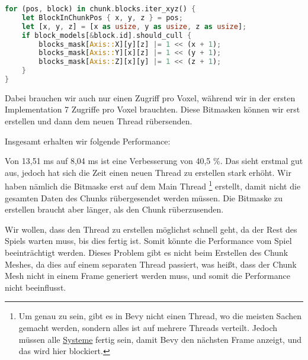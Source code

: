 \begin{lstlisting}[language=Rust]
for (pos, block) in chunk.blocks.iter_xyz() {
	let BlockInChunkPos { x, y, z } = pos;
	let [x, y, z] = [x as usize, y as usize, z as usize];
	if block_models[&block.id].should_cull {
		blocks_mask[Axis::X][y][z] |= 1 << (x + 1);
		blocks_mask[Axis::Y][x][z] |= 1 << (y + 1);
		blocks_mask[Axis::Z][x][y] |= 1 << (z + 1);
	}
}
\end{lstlisting}

Dabei brauchen wir auch nur einen Zugriff pro Voxel,
während wir in der ersten Implementation 7 Zugriffe
pro Voxel brauchten.
Diese Bitmasken können wir erst erstellen und
dann dem neuen Thread rübersenden.


Insgesamt erhalten wir folgende Performance:

\vspace{0.3cm}


\vspace{0.3cm}

Von 13,51 ms auf 8,04 ms ist eine Verbesserung
von 40,5 \%. Das sieht erstmal gut aus,
jedoch hat sich die Zeit einen neuen Thread zu
erstellen stark erhöht. Wir haben nämlich die Bitmaske
erst auf dem Main Thread
\footnote{Um genau zu sein, gibt es in Bevy
nicht einen  Thread, wo die meisten Sachen
gemacht werden, sondern alles ist auf mehrere Threads
verteilt. Jedoch müssen alle
\href{https://bevy-cheatbook.github.io/programming/systems.html}{Systeme}
fertig sein, damit Bevy den nächsten Frame anzeigt,
und das wird hier blockiert.}
erstellt, damit nicht die
gesamten Daten des Chunks rübergesendet werden müssen.
Die Bitmaske zu erstellen braucht aber länger,
als den Chunk rüberzusenden.

Wir wollen, dass den Thread zu erstellen möglichst
schnell geht, da der Rest des Spiels warten muss,
bis dies fertig ist. Somit könnte die Performance
vom Spiel beeinträchtigt werden. Dieses Problem gibt
es nicht beim Erstellen des Chunk Meshes, da dies auf
einem separaten Thread passiert, was heißt, dass der
Chunk Mesh nicht in einem Frame generiert werden muss,
und somit die Performance nicht beeinflusst.

